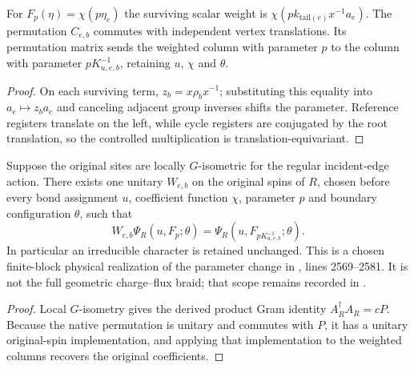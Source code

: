 \begin{lemma}
    \label{thm:peps_regular_charge_flux_weighted_columns}
    \leanok
    For $F_p(\eta)=\chi(p\eta_e)$ the surviving scalar weight is
    $\chi(pk_{\mathrm{tail}(e)}x^{-1}a_e)$. The permutation $C_{e,b}$
    commutes with independent vertex translations. Its permutation matrix
    sends the weighted column with parameter $p$ to the column with
    parameter $pK_{u,e,b}^{-1}$, retaining $u$, $\chi$ and $\theta$.
\end{lemma}
\begin{proof}\leanok
    On each surviving term, $z_b=x\rho_bx^{-1}$; substituting this equality
    into $a_e\mapsto z_ba_e$ and canceling adjacent group inverses shifts the parameter.
    Reference registers translate on the left, while cycle registers are
    conjugated by the root translation, so the controlled multiplication
    is translation-equivariant.
\end{proof}

\begin{lemma}
    \label{thm:peps_regular_charge_flux_physical_transport}
    \leanok
    Suppose the original sites are locally $G$-isometric for the regular
    incident-edge action. There exists one unitary $W_{e,b}$ on the original
    spins of $R$, chosen before every bond assignment $u$, coefficient
    function $\chi$, parameter $p$ and boundary configuration $\theta$, such that
    \[
        W_{e,b}\Psi_R(u,F_p;\theta)
        =\Psi_R(u,F_{pK_{u,e,b}^{-1}};\theta).
    \]
    In particular an irreducible character is retained unchanged.
    This is a chosen finite-block physical realization of the parameter
    change in \cite{Schuch2010PEPS}, lines 2569--2581. It is not the full
    geometric charge--flux braid; that scope remains recorded in
    \cite{gap:rmp_peps_quantum_double_g_isometry}.
\end{lemma}
\begin{proof}\leanok
    Local $G$-isometry gives the derived product Gram identity $A_R^\dagger A_R=cP$.
    Because the native permutation is unitary and commutes with $P$, it has a
    unitary original-spin implementation, and applying that implementation to the
    weighted columns recovers the original coefficients.
\end{proof}
